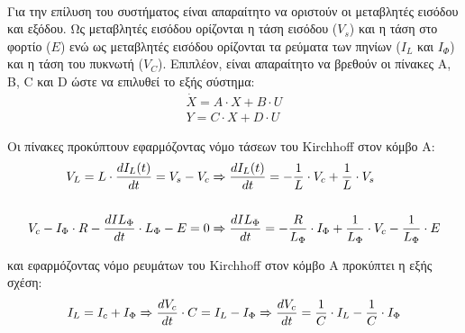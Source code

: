 \noindent\\
Για την επίλυση του συστήματος είναι απαραίτητο να οριστούν οι μεταβλητές εισόδου και εξόδου.  Ως μεταβλητές εισόδου ορίζονται η τάση εισόδου ($V_s$) και η τάση στο φορτίο ($E$) ενώ ως μεταβλητές εισόδου ορίζονται τα ρεύματα των πηνίων ($I_L$ και $Ι_{\Phi}$) και η τάση του πυκνωτή ($V_C$). Επιπλέον, είναι απαραίτητο να βρεθούν οι πίνακες A, B, C και D ώστε να επιλυθεί το εξής σύστημα:
\begin{align}
	\dot{X} = A\cdot X + B\cdot U \label{x_dot}\\
	Y = C \cdot X + D \cdot U \label{y}
\end{align} 

\noindent
Οι πίνακες προκύπτουν εφαρμόζοντας νόμο τάσεων του Kirchhoff στον κόμβο Α:
\begin{align}
											V_L = L \cdot \frac{dI_L(t)}{dt} = V_s - V_c &\xRightarrow{} \frac{dI_L (t)}{dt} = - \frac{1}{L} \cdot V_c + \frac{1}{L} \cdot V_s\\
											\notag \\
	V_c - I_{\Phi} \cdot R - \frac{dIL_{\Phi}}{dt} \cdot L_{\Phi} - E = 0 &\xRightarrow{}  \frac{dIL_{\Phi}}{dt} = -\frac{R}{L_{\Phi}} \cdot I_{\Phi} + \frac{1}{L_{\Phi}} \cdot V_c - \frac{1}{L_{\Phi}} \cdot E
\end{align}

και εφαρμόζοντας νόμο ρευμάτων του Kirchhoff στον κόμβο Α προκύπτει η εξής σχέση:
\begin{equation}
	I_L = I_c + I_{\Phi} \xRightarrow{} \frac{dV_c}{dt} \cdot C = I_L - I_{\Phi} \xRightarrow{} \frac{dV_c}{dt} = \frac{1}{C} \cdot I_L - \frac{1}{C} \cdot I_{\Phi}
\end{equation}

